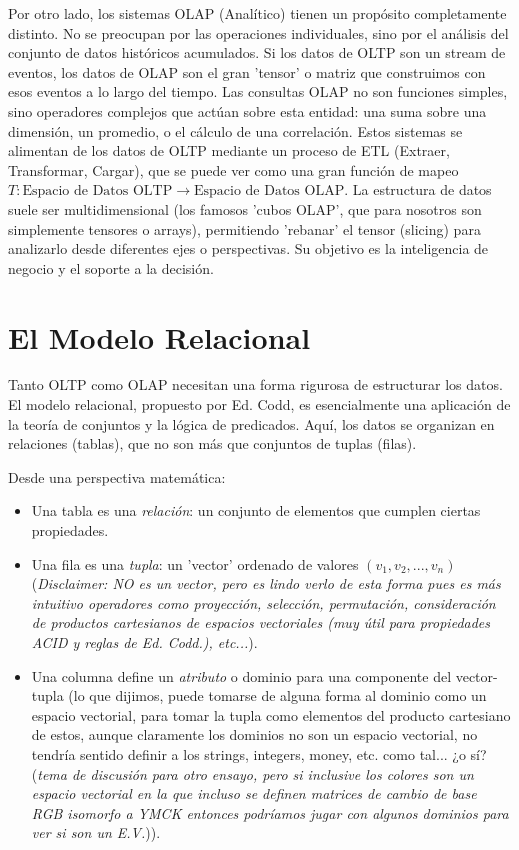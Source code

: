 \documentclass[12pt, letterpaper]{article}
\begin{document}
Por otro lado, los sistemas OLAP (Analítico) tienen un propósito completamente distinto. No se preocupan por las operaciones individuales, sino por el análisis del conjunto de datos históricos acumulados. Si los datos de OLTP son un stream de eventos, los datos de OLAP son el gran 'tensor' o matriz que construimos con esos eventos a lo largo del tiempo. Las consultas OLAP no son funciones simples, sino operadores complejos que actúan sobre esta entidad: una suma sobre una dimensión, un promedio, o el cálculo de una correlación. Estos sistemas se alimentan de los datos de OLTP mediante un proceso de ETL (Extraer, Transformar, Cargar), que se puede ver como una gran función de mapeo $T: \text{Espacio de Datos OLTP} \rightarrow \text{Espacio de Datos OLAP}$. La estructura de datos suele ser multidimensional (los famosos 'cubos OLAP', que para nosotros son simplemente tensores o arrays), permitiendo 'rebanar' el tensor (slicing) para analizarlo desde diferentes ejes o perspectivas. Su objetivo es la inteligencia de negocio y el soporte a la decisión.

\section*{El Modelo Relacional}

Tanto OLTP como OLAP necesitan una forma rigurosa de estructurar los datos. El modelo relacional, propuesto por Ed. Codd, es esencialmente una aplicación de la teoría de conjuntos y la lógica de predicados. Aquí, los datos se organizan en relaciones (tablas), que no son más que conjuntos de tuplas (filas).

Desde una perspectiva matemática:
\begin{itemize}
    \item Una tabla es una \textit{relación}: un conjunto de elementos que cumplen ciertas propiedades.
    \item Una fila es una \textit{tupla}: un 'vector' ordenado de valores $(v_1, v_2, ..., v_n)$ (\textit{Disclaimer: NO es un vector, pero es lindo verlo de esta forma pues es más intuitivo operadores como proyección, selección, permutación, consideración de productos cartesianos de espacios vectoriales (muy útil para propiedades ACID y reglas de Ed. Codd.), etc...}).
    \item Una columna define un \textit{atributo} o dominio para una componente del vector-tupla (lo que dijimos, puede tomarse de alguna forma al dominio como un espacio vectorial, para tomar la tupla como elementos del producto cartesiano de estos, aunque claramente los dominios no son un espacio vectorial, no tendría sentido definir a los strings, integers, money, etc. como tal... ¿o sí? (\textit{tema de discusión para otro ensayo, pero si inclusive los colores son un espacio vectorial en la que incluso se definen matrices de cambio de base RGB isomorfo a YMCK entonces podríamos jugar con algunos dominios para ver si son un E.V.})).
\end{itemize}
\end{document}
